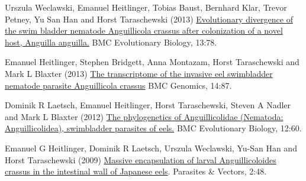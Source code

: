 \documentclass[10pt,A4paper]{article}
\renewenvironment{itemize}{
  \begin{list}{}{
    \setlength{\leftmargin}{1.5em}
    \setlength{\itemsep}{0.25em}
    \setlength{\parskip}{0pt}
    \setlength{\parsep}{0.25em}
  }
}{
  \end{list}
}
\begin{document}
\begin{itemize}

\item Urszula Weclawski, Emanuel Heitlinger, Tobias Baust,
  Bernhard Klar, Trevor Petney, Yu San Han and Horst Taraschewski
  (2013) 
  \href{http://www.biomedcentral.com/1471-2148/13/78}{
    Evolutionary divergence of the swim bladder nematode
    Anguillicola crassus after colonization of a novel host,
    Anguilla anguilla.} BMC Evolutionary Biology,
  13:78.

\item Emanuel Heitlinger, Stephen Bridgett, Anna Montazam,
  Horst Taraschewski and Mark L Blaxter (2013)
  \href{http://www.biomedcentral.com/1471-2164/14/87}{The
    transcriptome of the invasive eel swimbladder nematode parasite
    Anguillicola crassus} BMC Genomics, 
  14:87.

\item Dominik R Laetsch, Emanuel Heitlinger, Horst
  Taraschewski, Steven A Nadler and Mark L Blaxter (2012)
  \href{http://www.biomedcentral.com/1471-2148/12/60} {The
    phylogenetics of Anguillicolidae (Nematoda: Anguillicolidea),
    swimbladder parasites of eels.} BMC Evolutionary Biology,
  12:60.

\item Emanuel G Heitlinger, Dominik R Laetsch, Urszula
  Weclawski, Yu-San Han and Horst Taraschewski (2009)
  \href{http://www.parasitesandvectors.com/content/2/1/48}{Massive
    encapsulation of larval Anguillicoloides crassus in the
    intestinal wall of Japanese eels}. Parasites \& Vectors,
  2:48.
\end{itemize}

%


\end{document}
